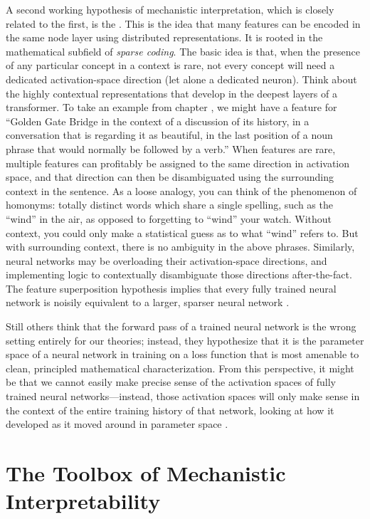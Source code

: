A second working hypothesis of mechanistic interpretation, which is closely
related to the first, is the . This
is the idea that many features can be encoded in the same node layer using
distributed representations. It is rooted in the mathematical subfield of
\emph{sparse coding}. The basic idea is that, when the presence of any
particular concept in a context is rare, not every concept will need a
dedicated activation-space direction (let alone a dedicated neuron). Think
about the highly contextual representations that develop in the deepest layers
of a transformer. To take an example from chapter , we
might have a feature for ``Golden Gate Bridge in the context of a discussion of
its history, in a conversation that is regarding it as beautiful, in the last
position of a noun phrase that would normally be followed by a verb.'' When
features are rare, multiple features can profitably be assigned to the same
direction in activation space, and that direction can then be disambiguated
using the surrounding context in the sentence. As a loose analogy, you can
think of the phenomenon of homonyms: totally distinct words which share a
single spelling, such as the ``wind'' in the air, as opposed to forgetting to
``wind'' your watch. Without context, you could only make a statistical guess
as to what ``wind'' refers to. But with surrounding context, there is no
ambiguity in the above phrases. Similarly, neural networks may be overloading
their activation-space directions, and implementing logic to contextually
disambiguate those directions after-the-fact. The feature superposition
hypothesis implies that every fully trained neural network is noisily
equivalent to a larger, sparser neural network \cite{elhage2022superposition}.

Still others think that the forward pass of a trained neural network is the
wrong setting entirely for our theories; instead, they hypothesize that it is
the parameter space of a neural network in training on a loss function that is
most amenable to clean, principled mathematical characterization. From this
perspective, it might be that we cannot easily make precise sense of the
activation spaces of fully trained neural networks---instead, those activation
spaces will only make sense in the context of the entire training history of
that network, looking at how it developed as it moved around in parameter
space \cite{hoogland2025lossland, bushnaq2024degeneracy}.

\section{The Toolbox of Mechanistic Interpretability}


